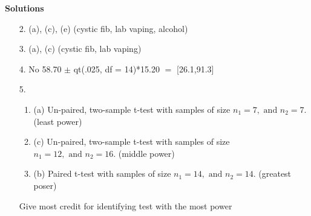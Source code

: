 \documentclass[12pt]{article}
\begin{document}
\pagebreak 
\textbf{Solutions}
\begin{enumerate}[leftmargin=\labelsep]

 
\item[2.] (a), (c), (e) (cystic fib, lab vaping, alcohol) 

\item[3.]  (a), (c) (cystic fib, lab vaping) 

\item[4.] No  58.70  $\pm$ qt(.025, df = 14)*15.20 $=$ [26.1,91.3]

\item[5.] 

\begin{enumerate}
    \item (a) Un-paired, two-sample t-test with samples of size $n_1=7, \text{ and } n_2=7$. (least power)
    \item (c) Un-paired, two-sample t-test with samples of size $n_1=12, \text{ and } n_2=16$. (middle power)
    \item (b) Paired t-test with samples of size $n_1=14, \text{ and } n_2=14$. (greatest poser) 
\end{enumerate}

Give most credit for identifying test with the most power 


\end{enumerate}
\end{document}
